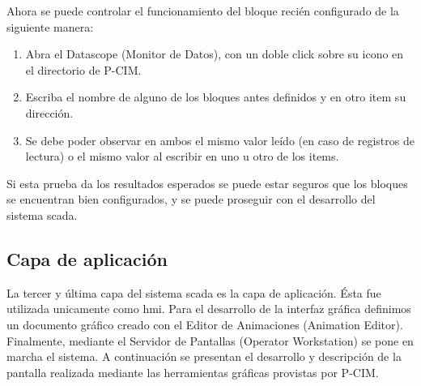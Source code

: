 Ahora se puede controlar el funcionamiento del bloque recién configurado de la 
siguiente manera:
\begin{enumerate}
  \item Abra el Datascope (Monitor de Datos), con un doble click sobre su icono 
  en el directorio de P-CIM.
  \item Escriba el nombre de alguno de los bloques antes definidos  y en otro 
  item su dirección.
  \item Se debe poder observar en ambos el mismo valor leído (en caso de
  registros de lectura) o el mismo valor al escribir en uno u otro de los items.
\end{enumerate}
Si esta prueba da los resultados esperados se puede estar seguros que
los bloques se encuentran bien configurados, y se puede proseguir con el
desarrollo del sistema \gls{scada}.

\subsection{Capa de aplicación}
\label{subsec:CapaAplicacion}

La tercer y última capa del sistema \gls{scada} es la capa de aplicación. Ésta
fue utilizada unicamente como \gls{hmi}. Para el
desarrollo de la interfaz gráfica definimos un documento gráfico creado con el 
Editor de Animaciones (Animation Editor). Finalmente, mediante el Servidor de 
Pantallas (Operator Workstation) se pone en marcha el sistema. A continuación se 
presentan el desarrollo y descripción de la pantalla realizada mediante las 
herramientas gráficas provistas por P-CIM.



